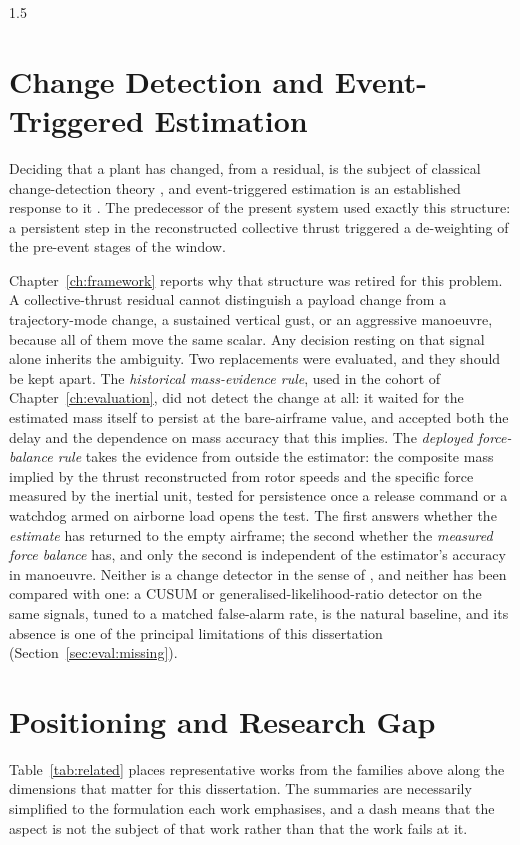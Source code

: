 \begin{spacing}{1.5}
\section{Change Detection and Event-Triggered Estimation}

Deciding that a plant has changed, from a residual, is the subject of classical
change-detection theory \cite{basseville1993}, and event-triggered estimation is
an established response to it \cite{heemels2012}. The predecessor of the present
system used exactly this structure: a persistent step in the reconstructed
collective thrust triggered a de-weighting of the pre-event stages of the window.

Chapter~\ref{ch:framework} reports why that structure was retired for this
problem. A collective-thrust residual cannot distinguish a payload change from a
trajectory-mode change, a sustained vertical gust, or an aggressive manoeuvre,
because all of them move the same scalar. Any decision resting on that signal
alone inherits the ambiguity. Two replacements were evaluated, and they should be
kept apart. The \emph{historical mass-evidence rule}, used in the cohort of
Chapter~\ref{ch:evaluation}, did not detect the change at all: it waited for the
estimated mass itself to persist at the bare-airframe value, and accepted both
the delay and the dependence on mass accuracy that this implies. The
\emph{deployed force-balance rule} takes the evidence from outside the
estimator: the composite mass implied by the thrust reconstructed from rotor
speeds and the specific force measured by the inertial unit, tested for
persistence once a release command or a watchdog armed on airborne load opens
the test. The first answers whether the \emph{estimate} has returned to the
empty airframe; the second whether the \emph{measured force balance} has, and
only the second is independent of the estimator's accuracy in manoeuvre. Neither
is a change detector in the sense of \cite{basseville1993}, and neither has been
compared with one: a CUSUM or generalised-likelihood-ratio detector on the same
signals, tuned to a matched false-alarm rate, is the natural baseline, and its
absence is one of the principal limitations of this dissertation
(Section~\ref{sec:eval:missing}).

\section{Positioning and Research Gap}\label{sec:lit:gap}

Table~\ref{tab:related} places representative works from the families above
along the dimensions that matter for this dissertation. The summaries are
necessarily simplified to the formulation each work emphasises, and a dash means
that the aspect is not the subject of that work rather than that the work fails
at it.


\end{spacing}
